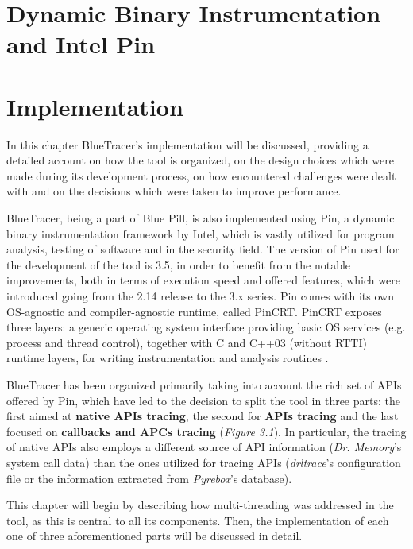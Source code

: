 \documentclass[binding=0.6cm,LaM,english,noexaminfo,oneside]{sapthesis} %
\begin{document}
\cleardoublepage
{} %

\chapter{Dynamic Binary Instrumentation and Intel Pin}

\chapter{Implementation}
In this chapter BlueTracer's implementation will be discussed, providing a detailed account on how the tool is organized, on the design choices which were made during its development process, on how encountered challenges were dealt with and on the decisions which were taken to improve performance.

BlueTracer, being a part of Blue Pill, is also implemented using Pin, a dynamic binary instrumentation framework by Intel, which is vastly utilized for program analysis, testing of software and in the security field. The version of Pin used for the development of the tool is 3.5, in order to benefit from the notable improvements, both in terms of execution speed and offered features, which were introduced going from the 2.14 release to the 3.x series. Pin comes with its own OS-agnostic and compiler-agnostic runtime, called PinCRT. PinCRT exposes three layers: a generic operating system interface providing basic OS services (e.g. process and thread control), together with C and C++03 (without RTTI) runtime layers, for writing instrumentation and analysis routines \cite{Pin}.   

BlueTracer has been organized primarily taking into account the rich set of APIs offered by Pin, which have led to the decision to split the tool in three parts: the first aimed at \textbf{native APIs tracing}, the second for \textbf{APIs tracing} and the last focused on \textbf{callbacks and APCs tracing} (\textit{Figure 3.1}). In particular, the tracing of native APIs also employs a different source of API information (\textit{Dr. Memory}'s system call data) than the ones utilized for tracing APIs (\textit{drltrace}'s configuration file or the information extracted from \textit{Pyrebox}'s database).

This chapter will begin by describing how multi-threading was addressed in the tool, as this is central to all its components. Then, the implementation of each one of three aforementioned parts will be discussed in detail. 

\end{document}

